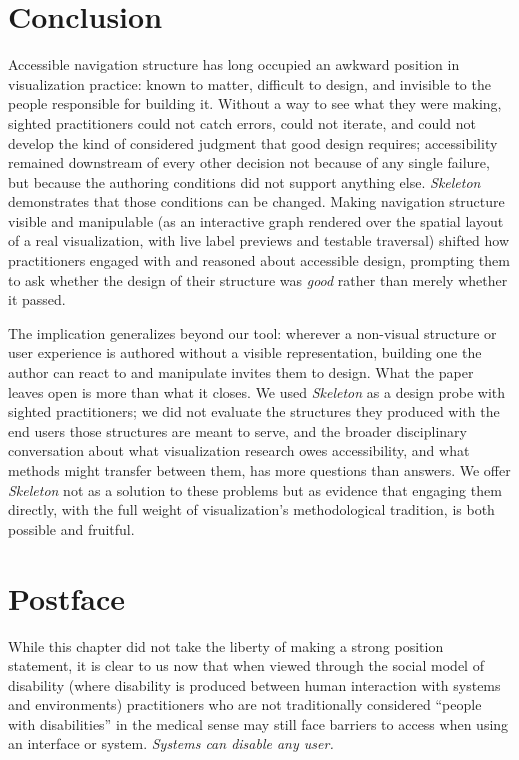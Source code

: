 \documentclass[12pt]{cmuthesis}
\begin{document}
\section{Conclusion}

Accessible navigation structure has long occupied an awkward position in visualization practice: known to matter, difficult to design, and invisible to the people responsible for building it. Without a way to see what they were making, sighted practitioners could not catch errors, could not iterate, and could not develop the kind of considered judgment that good design requires; accessibility remained downstream of every other decision not because of any single failure, but because the authoring conditions did not support anything else. \textit{Skeleton} demonstrates that those conditions can be changed. Making navigation structure visible and manipulable (as an interactive graph rendered over the spatial layout of a real visualization, with live label previews and testable traversal) shifted how practitioners engaged with and reasoned about accessible design, prompting them to ask whether the design of their structure was \textit{good} rather than merely whether it passed.

The implication generalizes beyond our tool: wherever a non-visual structure or user experience is authored without a visible representation, building one the author can react to and manipulate invites them to design. What the paper leaves open is more than what it closes. We used \textit{Skeleton} as a design probe with sighted practitioners; we did not evaluate the structures they produced with the end users those structures are meant to serve, and the broader disciplinary conversation about what visualization research owes accessibility, and what methods might transfer between them, has more questions than answers. We offer \textit{Skeleton} not as a solution to these problems but as evidence that engaging them directly, with the full weight of visualization's methodological tradition, is both possible and fruitful.

\newpage

\section{Postface}

While this chapter did not take the liberty of making a strong position statement, it is clear to us now that when viewed through the social model of disability (where disability is produced between human interaction with systems and environments) practitioners who are not traditionally considered ``people with disabilities'' in the medical sense may still face barriers to access when using an interface or system. \textit{Systems can disable any user.}
\end{document}

